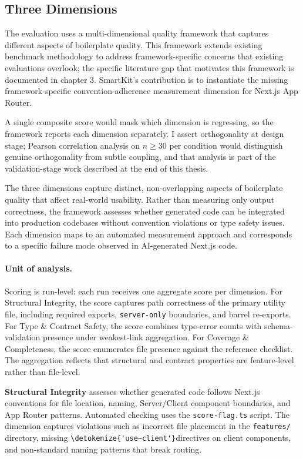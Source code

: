 \documentclass[12pt,a4paper]{report}
\newcommand{\code}[1]{\texttt{\nolinkurl{\detokenize{#1}}}}
\newcommand{\pkg}[1]{\texttt{\nolinkurl{#1}}}
\DeclareRobustCommand{\filename}[1]{\bgroup\urlstyle{tt}\nolinkurl{#1}\egroup}
\newcommand{\usec}{\code{'use~client'}}
\begin{document}
\subsection{Three Dimensions}
\label{sec:dimensions}

The evaluation uses a multi-dimensional quality framework that captures different aspects of boilerplate quality. This framework extends existing benchmark methodology to address framework-specific concerns that existing evaluations overlook; the specific literature gap that motivates this framework is documented in chapter 3. SmartKit's contribution is to instantiate the missing framework-specific convention-adherence measurement dimension for Next.js App Router.

A single composite score would mask which dimension is regressing, so the framework reports each dimension separately. I assert orthogonality at design stage; Pearson correlation analysis on $n \geq 30$ per condition would distinguish genuine orthogonality from subtle coupling, and that analysis is part of the validation-stage work described at the end of this thesis.

The three dimensions capture distinct, non-overlapping aspects of boilerplate quality that affect real-world usability. Rather than measuring only output correctness, the framework assesses whether generated code can be integrated into production codebases without convention violations or type safety issues. Each dimension maps to an automated measurement approach and corresponds to a specific failure mode observed in AI-generated Next.js code.

\paragraph{Unit of analysis.}
Scoring is run-level: each run receives one aggregate score per dimension. For Structural Integrity, the score captures path correctness of the primary utility file, including required exports, \pkg{server-only} boundaries, and barrel re-exports. For Type \& Contract Safety, the score combines type-error counts with schema-validation presence under weakest-link aggregation. For Coverage \& Completeness, the score enumerates file presence against the reference checklist. The aggregation reflects that structural and contract properties are feature-level rather than file-level.

\textbf{Structural Integrity} assesses whether generated code follows Next.js conventions for file location, naming, Server/Client component boundaries, and App Router patterns. Automated checking uses the \filename{score-flag.ts} script. The dimension captures violations such as incorrect file placement in the \filename{features/} directory, missing \usec directives on client components, and non-standard naming patterns that break routing.
\end{document}
